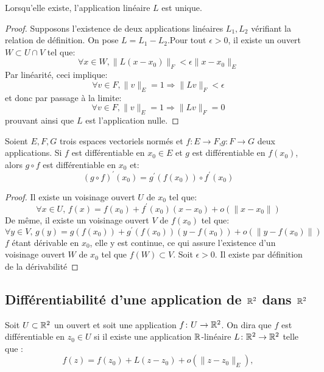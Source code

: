 \begin{prop}
Lorsqu'elle existe, l'application linéaire $L$ est unique.
\end{prop}
\begin{proof}
Supposons l'existence de deux applications linéaires  $L_1, L_2$ vérifiant la relation de définition. On pose $L =  L_1 - L_2$.Pour tout $\epsilon > 0$, il existe un ouvert $W \subset U \cap V$ tel que:
\[
\forall x \in W, \|L(x-x_0)\|_F < \epsilon \| x-x_0 \|_E
\]
Par linéarité, ceci implique:
\[
\forall v \in F, \|v\|_E = 1 \Rightarrow \|L v \|_F < \epsilon 
\]
et donc par passage à la limite:
\[
\forall v \in F, \|v\|_E = 1 \Rightarrow \|L v \|_F = 0
\]
prouvant ainsi que $L$ est l'application nulle.
\end{proof}
\begin{fprop}
  \label{prop:der_compo}
Soient $E,F,G$ trois espaces vectoriels normés et $f \colon E \to F$,$g \colon F \to G$ deux applications. Si $f$ est différentiable en $x_0 \in E$ et $g$ 
est différentiable en $f(x_0)$, alors $g \circ f$ est différentiable en $x_0$ et:
\begin{equation}
  \left( g \circ f \right)^\prime(x_0) = g^\prime\left( f(x_0) \right) \circ f^\prime(x_0)
\end{equation} 
\end{fprop}
\begin{proof}
  Il existe un voisinage ouvert $U$ de $x_0$ tel que:
  \begin{equation}
    \forall x \in U, \, f(x) = f(x_0) + f^\prime(x_0)\left( x-x_0 \right) + o\left( \| x - x_0 \| \right)
  \end{equation}
De même, il existe un voisinage ouvert $V$ de $f(x_0)$ tel que:
  \begin{equation}
    \forall y \in V, \, g(y) = g\left( f(x_0) \right)+ g^\prime \left( f(x_0) \right)\left( y-f(x_0) \right) + o\left( \| y - f(x_0) \| \right)
  \end{equation}
  $f$ étant dérivable en $x_0$, elle y est continue, ce qui assure l'existence d'un voisinage ouvert $W$ de $x_0$ tel que $f(W) \subset V.$ 
    Soit $\epsilon > 0$. Il existe par définition de la dérivabilité 
\end{proof}

\subsection{Différentiabilité d'une application de $\mathbb R^2$ dans $\mathbb R^2$}
\begin{fdefn}\label{def:1.2}
Soit $U \subset \mathbb R^2$ un ouvert et soit une application $f \colon U \to \mathbb R^2$.
On dira que $f$ est différentiable en $z_0 \in U$ si il existe une application $\mathbb R$-linéaire $ L \colon \mathbb R^2 \to \mathbb R^2$ telle que :
\[f(z)=f(z_0) + L(z-z_0) + o(\|z-z_0\|_E),\]
\end{fdefn}


